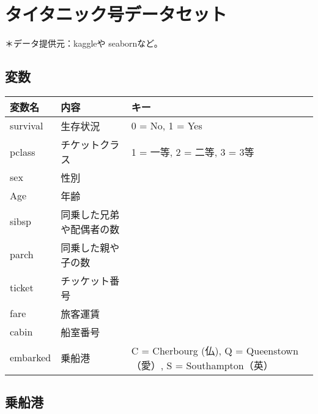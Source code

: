 \documentclass[9pt]{ltjsarticle}
\begin{document}
    \newpage

    \hypertarget{ux30bfux30a4ux30bfux30cbux30c3ux30afux53f7ux30c7ux30fcux30bfux30bbux30c3ux30c8}{%
\section{タイタニック号データセット}\label{ux30bfux30a4ux30bfux30cbux30c3ux30afux53f7ux30c7ux30fcux30bfux30bbux30c3ux30c8}}

    ＊データ提供元：kaggle\cite{kaggle}や seaborn\cite{seaborn}など。

    \hypertarget{ux5909ux6570}{%
\subsection{変数}\label{ux5909ux6570}}

    \begin{longtable}[]{@{}lll@{}}
\toprule
変数名　 & 内容 & キー\tabularnewline
\midrule
\endhead
survival & 生存状況 & 0 = No, 1 = Yes\tabularnewline
pclass　 & チケットクラス & 1 = 一等, 2 = 二等, 3 = 3等\tabularnewline
sex & 性別 &\tabularnewline
Age & 年齢 &\tabularnewline
sibsp & 同乗した兄弟や配偶者の数 &\tabularnewline
parch & 同乗した親や子の数 &\tabularnewline
ticket & チッケット番号 &\tabularnewline
fare & 旅客運賃 &\tabularnewline
cabin & 船室番号 &\tabularnewline
embarked & 乗船港 & C = Cherbourg (仏), Q = Queenstown（愛）, S =
Southampton（英）\tabularnewline
\bottomrule
\end{longtable}

    \hypertarget{ux4e57ux8239ux6e2f}{%
\subsection{乗船港}\label{ux4e57ux8239ux6e2f}}
\end{document}
